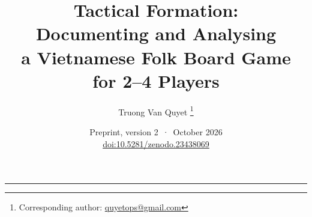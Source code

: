 


\title{%
  \textbf{Tactical Formation:}\\[0.3em]
  \textbf{Documenting and Analysing}\\[0.3em]
  \textbf{a Vietnamese Folk Board Game}\\[0.3em]
  \textbf{for 2--4 Players}
}
\author{%
  Truong Van Quyet%
  \thanks{Corresponding author: \href{mailto:quyetops@gmail.com}{quyetops@gmail.com}}
}
\date{Preprint, version 2 \,·\, October 2026\\[0.3em]
  \href{https://doi.org/10.5281/zenodo.23438069}{doi:10.5281/zenodo.23438069}}



\maketitle



\vspace{0.8em}
\hrule
\vspace{0.4em}

\tableofcontents
\newpage












\appendix








